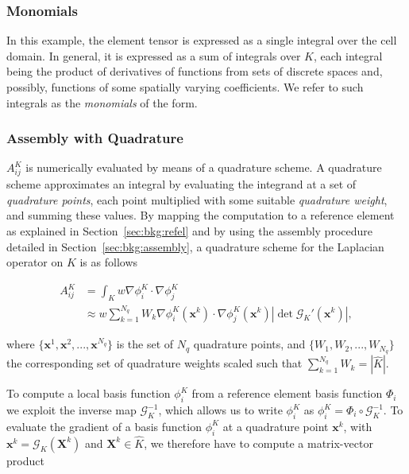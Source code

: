 \subsubsection{Monomials}
\label{sec:bkg:monomials}
In this example, the element tensor is expressed as a single integral over the cell domain. In general, it is expressed as a sum of integrals over $K$, each integral being the product of derivatives of functions from sets of discrete spaces and, possibly, functions of some spatially varying coefficients. We refer to such integrals as the \textit{monomials} of the form. 

\subsubsection{Assembly with Quadrature}
$A_{ij}^K$ is numerically evaluated by means of a quadrature scheme. A quadrature scheme approximates an integral by evaluating the integrand at a set of {\em quadrature points}, each point multiplied with some suitable {\em quadrature weight}, and summing these values. By mapping the computation to a reference element as explained in Section~\ref{sec:bkg:refel} and by using the assembly procedure detailed in Section~\ref{sec:bkg:assembly}, a quadrature scheme for the Laplacian operator on $K$ is as follows

\begin{equation}
\begin{split}
A_{ij}^K & = \int_K w \nabla \phi_i^K \cdot \nabla \phi_j^K \\
& \approx w \sum_{k=1}^{N_q} W_k \nabla \phi_i^K(\boldsymbol{x}^k) \cdot \nabla \phi_j^K (\boldsymbol{x}^k) | \operatorname{det} \mathcal{G}_K'(\boldsymbol{x}^k) |,
\end{split}
\end{equation} 

where $\lbrace \boldsymbol{x}^1, \boldsymbol{x}^2, ..., \boldsymbol{x}^{N_q} \rbrace$ is the set of $N_q$ quadrature points, and $\lbrace W_1, W_2, ..., W_{N_q} \rbrace$ the corresponding set of quadrature weights scaled such that $\sum_{k=1}^{N_q} W_k = |\hat{K}|$. 

To compute a local basis function $\phi_i^K$ from a reference element basis function $\Phi_i$ we exploit the inverse map $\mathcal{G}_K^{-1}$, which allows us to write $\phi_i^K$ as $\phi_i^K = \Phi_i \circ \mathcal{G}_K^{-1}$. To evaluate the gradient of a basis function $\phi_i^K$ at a quadrature point $\boldsymbol{x}^k$, with $\boldsymbol{x}^k = \mathcal{G}_K(\boldsymbol{X}^k)$ and $\boldsymbol{X}^k \in \hat{K}$, we therefore have to compute a matrix-vector product

